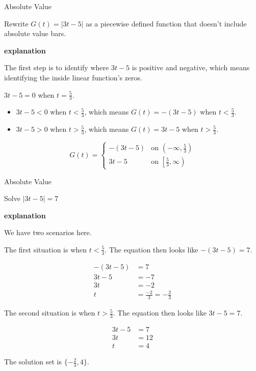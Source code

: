 \documentclass{ximera}
\begin{document}
\begin{example} Absolute Value


Rewrite $G(t) = | 3t - 5 |$ as a piecewise defined function that doesn't include absolute value bars.


\textbf{\textcolor{red!75!green}{explanation}} 
\hfill\break

The first step is to identify where $3t - 5$ is positive and negative, which means identifying the inside linear function's zeros.



$3t-5=0$ when $t=\frac{5}{3}$.


\begin{itemize}
\item $3t - 5 < 0$ when $t<\tfrac{5}{3}$, which means $G(t) = -(3t - 5)$ when $t<\tfrac{5}{3}$.
\item $3t - 5 > 0$ when $t>\tfrac{5}{3}$, which means $G(t) = 3t - 5$ when $t>\tfrac{5}{3}$.
\end{itemize}





\[
G(t) = 
\begin{cases}
  -(3t-5) &\text{on $\left( -\infty, \tfrac{5}{3} \right)$} \\
  3t-5 &\text{on $\left[ \tfrac{5}{3}, \infty \right)$}
\end{cases}
\]






\end{example}




\begin{example} Absolute Value


Solve $| 3t - 5 | = 7$

\textbf{\textcolor{red!75!green}{explanation}} 
\hfill\break

We have two scenarios here.

The first situation is when $t < \frac{5}{3}$.  The equation then looks like $-(3t - 5) = 7$.

\begin{align*}
-(3t - 5) & = 7 \\
3t - 5 & = -7  \\
3t & = -2  \\
t & = \frac{-2}{3} = -\frac{2}{3}
\end{align*}



The second situation is when $t > \frac{5}{3}$.  The equation then looks like $3t - 5 = 7$.

\begin{align*}
3t - 5 & = 7 \\
3t  & = 12  \\
t & = 4
\end{align*}


The solution set is $\{  -\frac{2}{3}, 4 \}$.




\end{example}
\end{document}
